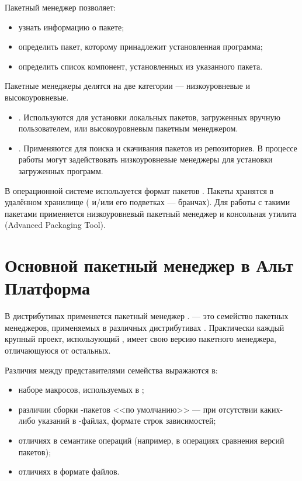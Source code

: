 Пакетный менеджер позволяет:

\begin{itemize}
	\item узнать информацию о пакете;
	\item определить пакет, которому принадлежит установленная программа;
	\item определить список компонент, установленных из указанного пакета.
\end{itemize}

Пакетные менеджеры делятся на две категории --- низкоуровневые и высокоуровневые.

\begin{itemize}
	\item {}. Используются для установки 
		локальных пакетов, загруженных вручную пользователем, или высокоуровневым пакетным менеджером.
	\item {}. Применяются для поиска и скачивания пакетов из репозиториев. 
		В процессе работы могут задействовать низкоуровневые менеджеры для установки загруженных программ.
\end{itemize}

В операционной системе  используется формат пакетов . 
Пакеты  хранятся в удалённом хранилище ( и/или его подветках --- бранчах). 
Для работы с такими пакетами применяется низкоуровневый пакетный менеджер  
и консольная утилита  (Advanced Packaging Tool). 

\section{Основной пакетный менеджер в Альт Платформа}
В дистрибутивах  применяется пакетный менеджер .  --- 
это семейство пакетных менеджеров, применяемых в различных дистрибутивах . 
Практически каждый крупный проект, использующий , имеет свою версию пакетного менеджера, 
отличающуюся от остальных.

Различия между представителями семейства  выражаются в:

\begin{itemize}
	\item наборе макросов, используемых в ;
	\item различии сборки -пакетов <<по умолчанию>> --- при отсутствии каких-либо 
		указаний в -файлах, формате строк зависимостей;
	\item отличиях в семантике операций (например, в операциях сравнения версий пакетов);
	\item отличиях в формате файлов.
\end{itemize}

